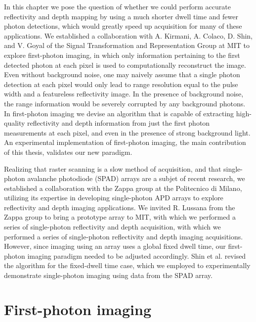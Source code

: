 In this chapter we pose the question of whether we could perform accurate reflectivity and depth mapping by using a much shorter dwell time and fewer photon detections, which would greatly speed up acquisition for many of these applications. We established a collaboration with A. Kirmani, A. Colaco, D. Shin, and V. Goyal of the Signal Transformation and Representation Group at MIT to explore first-photon imaging, in which only information pertaining to the first detected photon at each pixel is used to computationally reconstruct the image. Even without background noise, one may naively assume that a single photon detection at each pixel would only lead to range resolution equal to the pulse width and a featureless reflectivity image. In the presence of background noise, the range information would be severely corrupted by any background photons. In first-photon imaging we devise an algorithm that is capable of extracting high-quality reflectivity and depth information from just the first photon measurements at each pixel, and even in the presence of strong background light. An experimental implementation of first-photon imaging, the main contribution of this thesis, validates our new paradigm.

Realizing that raster scanning is a slow method of acquisition, and that single-photon avalanche photodiode (SPAD) arrays are a subjet of recent research, we established a collaboration with the Zappa group at the Politecnico di Milano, utilizing its expertise in developing single-photon APD arrays \cite{villa-spad,guerrieri-two,scarcella-low} to explore reflectivity and depth imaging applications. We invited R. Lussana from the Zappa group to bring a prototype array to MIT, with which we performed a series of single-photon reflectivity and depth acquisition, with which we performed a series of single-photon reflectivity and depth imaging acquisitions. However, since imaging using an array uses a global fixed dwell time, our first-photon imaging paradigm needed to be adjusted accordingly. Shin et al. revised the algorithm for the fixed-dwell time case\cite{kirmani-photon}, which we employed to experimentally demonstrate single-photon imaging using data from the SPAD array.

\section{First-photon imaging}

